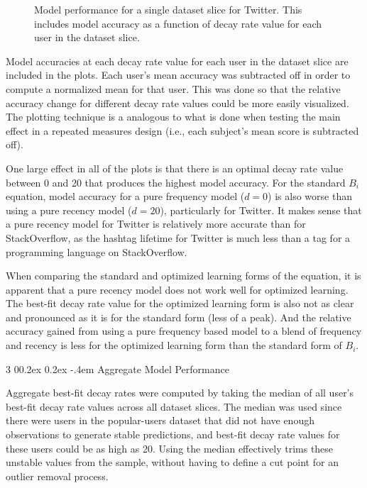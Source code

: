 \documentclass[man,donotrepeattitle]{apa6}
\makeatletter
\renewcommand{\subsubsection}{%
  \@startsection
  {subsubsection}%
  {3}%
  {\parindent}%
  {0\baselineskip \@plus 0.2ex \@minus 0.2ex}%
  {-.4em}%
  {\normalfont\normalsize\bfseries\addperi}}
\makeatother
\begin{document}
\begin{figure}[!htbp]
  {%
    \setlength{\fboxsep}{0pt}%
    \setlength{\fboxrule}{1pt}%
    \hfill
    \hfill
    \caption{
      Model performance for a single dataset slice for Twitter.
      This includes model accuracy as a function of decay rate value for each user in the dataset slice.
    }
    \label{figPriorTwitterSliceDsStd}
  }%
\end{figure}

Model accuracies at each decay rate value for each user in the dataset slice are included in the plots.
Each user's mean accuracy was subtracted off in order to compute a normalized mean for that user.
This was done so that the relative accuracy change for different decay rate values could be more easily visualized.
The plotting technique is a analogous to what is done when testing the main effect in a repeated measures design (i.e., each subject's mean score is subtracted off).

One large effect in all of the plots is that there is an optimal decay rate value between 0 and 20 that produces the highest model accuracy.
For the standard $B_{i}$ equation, model accuracy for a pure frequency model ($d=0$) is also worse than using a pure recency model ($d=20$), particularly for Twitter.
It makes sense that a pure recency model for Twitter is relatively more accurate than for StackOverflow, as the hashtag lifetime for Twitter is much less than a tag for a programming language on StackOverflow.

When comparing the standard and optimized learning forms of the equation, it is apparent that a pure recency model does not work well for optimized learning.
The best-fit decay rate value for the optimized learning form is also not as clear and pronounced as it is for the standard form (less of a peak).
And the relative accuracy gained from using a pure frequency based model to a blend of frequency and recency is less for the optimized learning form than the standard form of $B_{i}$.

\subsubsection{Aggregate Model Performance}

Aggregate best-fit decay rates were computed by taking the median of all user's best-fit decay rate values across all dataset slices.
The median was used since there were users in the popular-users dataset that did not have enough observations to generate stable predictions, and best-fit decay rate values for these users could be as high as 20.
Using the median effectively trims these unstable values from the sample, without having to define a cut point for an outlier removal process.
\end{document}
